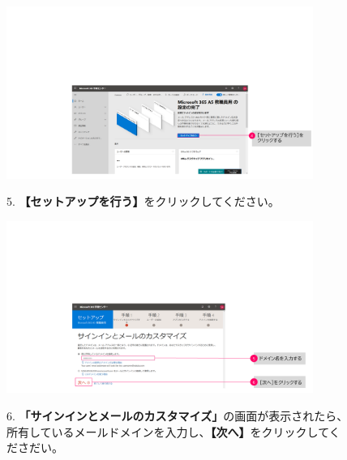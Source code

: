 \begin{figure}[h]
    \begin{minipage}{0.6\textwidth}
        \vspace{-2cm}
        \includegraphics[width=10cm]{figures/M365_setting1-03.png}
    \end{minipage}
    \begin{minipage}{0.4\textwidth}
        5. \textbf{【セットアップを行う】}をクリックしてください。
    \end{minipage}
\end{figure}

\begin{figure}[h]
    \begin{minipage}{0.6\textwidth}
        \vspace{-1.5cm}
        \includegraphics[width=10cm]{figures/M365_setting1-04.png}
    \end{minipage}
    \begin{minipage}{0.4\textwidth}
        6. \textbf{「サインインとメールのカスタマイズ」}の画面が表示されたら、所有しているメールドメインを入力し、\textbf{【次へ】}をクリックしてくださだい。
    \end{minipage}
\end{figure}


